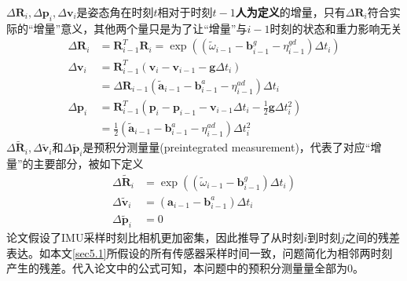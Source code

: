$\Delta\mathbf{R}_i,\Delta\mathbf{p}_i,\Delta\mathbf{v}_i$是姿态角在时刻$t$相对于时刻$t-1$\textbf{人为定义}的增量，只有$\Delta\mathbf{R}_i$符合实际的“增量”意义，其他两个量只是为了让“增量”与$i-1$时刻的状态和重力影响无关
\begin{equation}
    \begin{aligned}
        \Delta\mathbf{R}_i&=\mathbf{R}_{i-1}^T\mathbf{R}_i =\exp\left(\left(\widetilde{\omega}_{i-1}-\mathbf{b}_{i-1}^g-\eta_{i-1}^{gd}\right)\Delta t_i\right)\\
        \Delta\mathbf{v}_i&=\mathbf{R}_{i-1}^T\left(\mathbf{v}_i-\mathbf{v}_{i-1}-\mathbf{g}\Delta t_i\right)\\
        &=\Delta\mathbf{R}_{i-1}\left(\widetilde{\mathbf{a}}_{i-1}-\mathbf{b}_{i-1}^a-\eta_{i-1}^{ad}\right)\Delta t_i\\
        \Delta\mathbf{p}_i&=\mathbf{R}_{i-1}^T\left(\mathbf{p}_i-\mathbf{p}_{i-1}-\mathbf{v}_{i-1}\Delta t_i-\frac{1}{2}\mathbf{g}\Delta t_i^2 \right)\\
        &=\frac{1}{2}\left(\widetilde{\mathbf{a}}_{i-1}-\mathbf{b}_{i-1}^a-\eta_{i-1}^{ad}\right)\Delta t_i^2
    \end{aligned}
\end{equation}
$\Delta\tilde{\mathbf{R}}_{i},\Delta\tilde{\mathbf{v}}_{i}$和$\Delta\tilde{\mathbf{p}}_{i}$是预积分测量量(preintegrated measurement)，代表了对应“增量”的主要部分，被如下定义
\begin{equation}
    \begin{aligned}
        \Delta\tilde{\mathbf{R}}_{i}&=\exp\left((\widetilde{\omega}_{i-1}-\mathbf{b}_{i-1}^g)\Delta t_i\right)\\
        \Delta\tilde{\mathbf{v}}_{i}&=(\mathbf{a}_{i-1}-\mathbf{b}_{i-1}^a)\Delta t_i\\
        \Delta\tilde{\mathbf{p}}_{i}&=0
    \end{aligned}
\end{equation}
论文假设了IMU采样时刻比相机更加密集，因此推导了从时刻$i$到时刻$j$之间的残差表达。如本文\ref{sec5.1}所假设的所有传感器采样时间一致，问题简化为相邻两时刻产生的残差。代入论文中的公式可知，本问题中的预积分测量量全部为0。